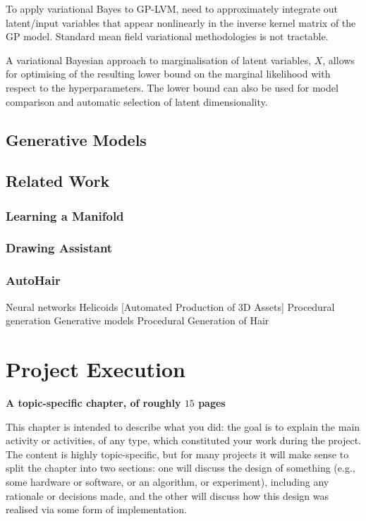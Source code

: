 \documentclass[ %
                    author={Dillon Keith Diep},
                supervisor={Dr. Carl Henrik Ek},
                    degree={MEng},
                     title={Assisted Content Generation for 3D Hair Geometry},
                  subtitle={[INCOMPLETE DRAFT, CONTAINS NOTES FROM RESEARCH]},
                      type={Research},
                      year={2014} ]{dissertation}
\begin{document}
	To apply variational Bayes to GP-LVM, need to approximately integrate out latent/input variables that appear nonlinearly in the inverse kernel matrix of the GP model. Standard mean field variational methodologies is not tractable.
	
	A variational Bayesian approach to marginalisation of latent variables, $X$, allows for optimising of the resulting lower bound on the marginal likelihood with respect to the hyperparameters. The lower bound can also be used for model comparison and automatic selection of latent dimensionality.
\fi


\section{Generative Models}

\section{Related Work}
\subsection{Learning a Manifold}
\cite{fontmanifold}


\subsection{Drawing Assistant}

\subsection{AutoHair}
\cite{autohair}
Neural networks
Helicoids
[Automated Production of 3D Assets]
Procedural generation
Generative models
Procedural Generation of Hair 




\chapter{Project Execution}
\label{chap:execution}

{\bf A topic-specific chapter, of roughly $15$ pages} 
\vspace{1cm} 

\noindent
This chapter is intended to describe what you did: the goal is to explain
the main activity or activities, of any type, which constituted your work 
during the project.  The content is highly topic-specific, but for many 
projects it will make sense to split the chapter into two sections: one 
will discuss the design of something (e.g., some hardware or software, or 
an algorithm, or experiment), including any rationale or decisions made, 
and the other will discuss how this design was realised via some form of 
implementation.  
\end{document}
